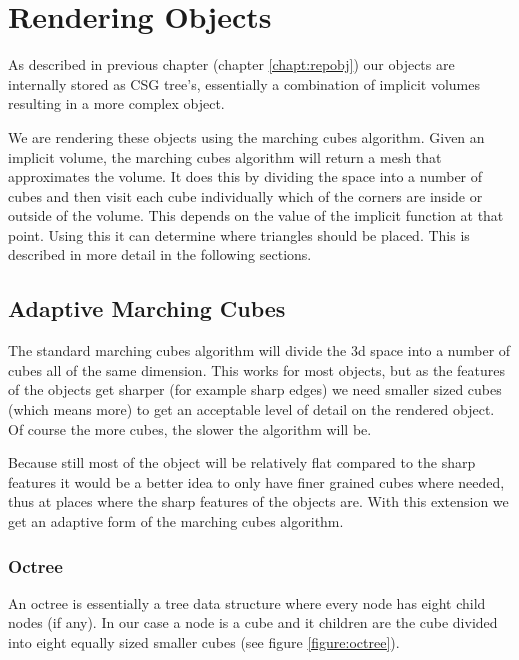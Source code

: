 \documentclass[a4paper,10pt,twocolumn]{article}
\begin{document}
\section{Rendering Objects}

As described in previous chapter (chapter \ref{chapt:repobj}) our objects are internally stored as CSG tree's, essentially a combination of implicit volumes resulting in a more complex object.

We are rendering these objects using the marching cubes algorithm. Given an implicit volume, the marching cubes algorithm will return a mesh that approximates the volume. It does this by dividing the space into a number of cubes and then visit each cube individually which of the corners are inside or outside of the volume. This depends on the value of the implicit function at that point. Using this it can determine where triangles should be placed. This is described in more detail in the following sections.

\subsection{Adaptive Marching Cubes}

The standard marching cubes algorithm will divide the 3d space into a number of cubes all of the same dimension. This works for most objects, but as the features of the objects get sharper (for example sharp edges) we need smaller sized cubes (which means more) to get an acceptable level of detail on the rendered object. Of course the more cubes, the slower the algorithm will be.

Because still most of the object will be relatively flat compared to the sharp features it would be a better idea to only have finer grained cubes where needed, thus at places where the sharp features of the objects are. With this extension we get an adaptive form of the marching cubes algorithm.

\subsubsection{Octree}

An octree is essentially a tree data structure where every node has eight child nodes (if any). In our case a node is a cube and it children are the cube divided into eight equally sized smaller cubes (see figure \ref{figure:octree}).
\end{document}
